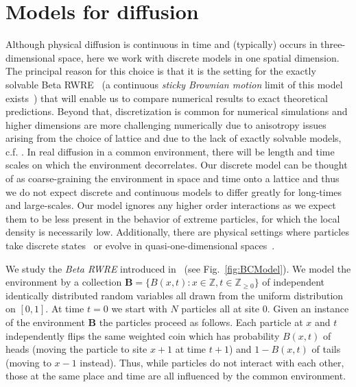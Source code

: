 \section{Models for diffusion}
Although physical diffusion is continuous in time and (typically) occurs in three-dimensional space, here we work with discrete models in one spatial dimension. The principal reason for this choice is that it is the setting for the exactly solvable  Beta RWRE~\cite{barraquandRandomwalkBetadistributedRandom2017a} (a continuous {\it sticky Brownian motion} limit of this model exists~\cite{barraquandLargeDeviationsSticky2020}) that will enable us to compare numerical results to exact theoretical predictions.
Beyond that, discretization is common for numerical simulations and higher dimensions are more challenging numerically due to anisotropy issues arising from the choice of lattice and due to the lack of exactly solvable models, c.f. \cite{ledoussalDiffusionTimedependentRandom2017}. In real diffusion in a common environment, there will be length and time scales on which the environment decorrelates.  Our discrete model can be thought of as coarse-graining the environment in space and time onto a lattice and thus we do not expect discrete and continuous models to differ greatly for long-times and large-scales. Our model ignores any higher order interactions as we expect them to be less present in the behavior of extreme particles, for which the local density is necessarily low. Additionally, there are physical settings where particles take discrete states~\cite{fellerDiffusionProcessesGenetics1951, moranRandomProcessesGenetics1958} or evolve in quasi-one-dimensional spaces~\cite{pollardGaseousSelfDiffusionLong1948,ahmadiDiffusionQuasionedimensionalChannels2017}.

We study the {\it Beta RWRE} introduced in~\cite{barraquandRandomwalkBetadistributedRandom2017a} (see Fig.~\ref{fig:BCModel}). We model the environment by a collection $\mathbf{B}= \big\{B(x,t):x\in \mathbb{Z},t\in \mathbb{Z}_{\geq 0}\big\}$ of independent identically distributed random variables all drawn from the uniform distribution on $[0,1]$. At time $t=0$ we start with $N$ particles all at site $0$. Given an instance of the environment $\mathbf{B}$ the particles proceed as follows. Each particle at $x$ and $t$ independently flips the same weighted coin which has probability $B(x,t)$ of heads (moving the particle to site $x+1$ at time $t+1$) and $1-B(x,t)$ of tails (moving to $x-1$ instead). Thus, while particles do not interact with each other, those at the same place and time are all influenced by the common environment.

